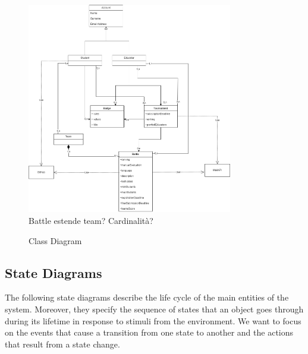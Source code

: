 \begin{figure}[H]
    \centering
    \includegraphics[width=0.8\textwidth]{images/state_diagrams/ClassDiagram.png}
    \\ {\color{red} Battle estende team? Cardinalità?} \\
    \caption{Class Diagram}
    \label{fig:class-diagram}
\end{figure}

\subsection{State Diagrams}
The following state diagrams describe the life cycle of the main entities of the system.
Moreover, they specify the sequence of states that an object goes through during its lifetime in response to stimuli from the environment.
We want to focus on the events that cause a transition from one state to another and the actions that result from a state change.

